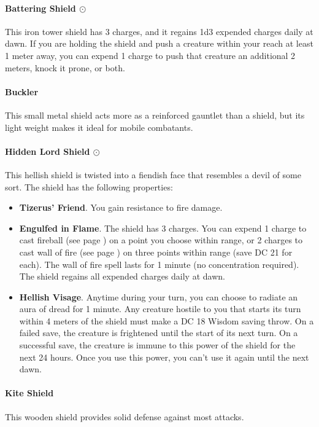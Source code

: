     \paragraph{Battering Shield $\odot$}
        This iron tower shield has 3 charges, and it regains 1d3 expended charges daily at dawn.
        If you are holding the shield and push a creature within your reach at least 1 meter away, you can expend 1 charge to push that creature an additional 2 meters, knock it prone, or both.
    \paragraph{Buckler}
        This small metal shield acts more as a reinforced gauntlet than a shield, but its light weight makes it ideal for mobile combatants.
    \paragraph{Hidden Lord Shield $\odot$}
        This hellish shield is twisted into a fiendish face that resembles a devil of some sort.
        The shield has the following properties:
        \begin{itemize}
            \item \textbf{Tizerus' Friend}.
            You gain resistance to fire damage.
            \item \textbf{Engulfed in Flame}.
            The shield has 3 charges.
            You can expend 1 charge to cast fireball (see page \pageref{spell::fireball}) on a point you choose within range, or 2 charges to cast wall of fire (see page \pageref{spell::firestorm}) on three points within range (save DC 21 for each).
            The wall of fire spell lasts for 1 minute (no concentration required).
            The shield regains all expended charges daily at dawn.
            \item \textbf{Hellish Visage}.
            Anytime during your turn, you can choose to radiate an aura of dread for 1 minute.
            Any creature hostile to you that starts its turn within 4 meters of the shield must make a DC 18 Wisdom saving throw.
            On a failed save, the creature is frightened until the start of its next turn.
            On a successful save, the creature is immune to this power of the shield for the next 24 hours.
            Once you use this power, you can't use it again until the next dawn.
        \end{itemize}
    \paragraph{Kite Shield}
        This wooden shield provides solid defense against most attacks.

